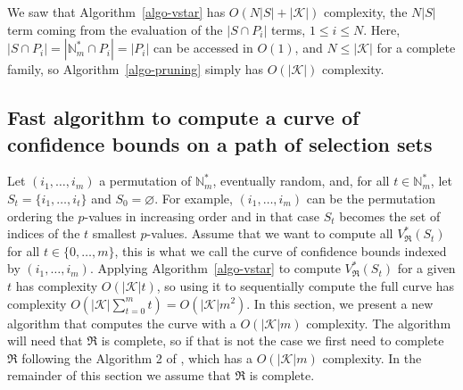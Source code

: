 \documentclass[
  11pt,
  a4paper,
]{article}
\theoremstyle{plain}
\theoremstyle{definition}
\theoremstyle{plain}
\theoremstyle{definition}
\theoremstyle{plain}
\theoremstyle{remark}
\newcounter{quartocallouttipno}
\newcommand{\quartocallouttip}[1]{\refstepcounter{quartocallouttipno}\label{#1}}
\begin{document}
\begin{tcolorbox}[enhanced jigsaw, arc=.35mm, bottomrule=.15mm, bottomtitle=1mm, breakable, colback=white, colbacktitle=quarto-callout-tip-color!10!white, colframe=quarto-callout-tip-color-frame, coltitle=black, left=2mm, leftrule=.75mm, opacityback=0, opacitybacktitle=0.6, rightrule=.15mm, title=\textcolor{quarto-callout-tip-color}{\faLightbulb}\hspace{0.5em}{Tip \ref*{tip-pruning-complexity}}, titlerule=0mm, toprule=.15mm, toptitle=1mm]

\quartocallouttip{tip-pruning-complexity} 

We saw that Algorithm~\ref{algo-vstar} has \(O(N|S|+|\mathcal{K}|)\)
complexity, the \(N|S|\) term coming from the evaluation of the
\(|S\cap P_i|\) terms, \(1\leq i\leq N\). Here,
\(|S\cap P_i|=|\mathbb{N}_m^*\cap P_i|=|P_i|\) can be accessed in
\(O(1)\), and \(N\leq |\mathcal{K}|\) for a complete family, so
Algorithm~\ref{algo-pruning} simply has \(O(|\mathcal{K}|)\) complexity.

\end{tcolorbox}

\subsection{Fast algorithm to compute a curve of confidence bounds on a
path of selection sets}\label{sec-fast-curve}

Let \((i_1,\dotsc, i_m)\) a permutation of \(\mathbb{N}_m^*\),
eventually random, and, for all \(t\in\mathbb{N}_m^*\), let
\(S_t=\{i_1,\dotsc,i_t\}\) and \(S_0=\varnothing\). For example,
\((i_1,\dotsc, i_m)\) can be the permutation ordering the \(p\)-values
in increasing order and in that case \(S_t\) becomes the set of indices
of the \(t\) smallest \(p\)-values. Assume that we want to compute all
\(V^*_{\mathfrak{R}}(S_t)\) for all \(t\in\{ 0,\dotsc,m\}\), this is
what we call the curve of confidence bounds indexed by
\((i_1,\dotsc, i_m).\) Applying Algorithm~\ref{algo-vstar} to compute
\(V^*_{\mathfrak{R}}(S_t)\) for a given \(t\) has complexity
\(O(|\mathcal{K}|t)\), so using it to sequentially compute the full
curve has complexity
\(O\left(  |\mathcal{K}|\sum_{t=0}^m t\right)=O\left(|\mathcal{K}|m^2\right)\).
In this section, we present a new algorithm that computes the curve with
a \(O\left(|\mathcal{K}|m\right)\) complexity. The algorithm will need
that \(\mathfrak{R}\) is complete, so if that is not the case we first
need to complete \(\mathfrak{R}\) following the Algorithm 2 of
\citet{MR4178188}, which has a \(O(|\mathcal{K}|m)\) complexity. In the
remainder of this section we assume that \(\mathfrak{R}\) is complete.
\end{document}
